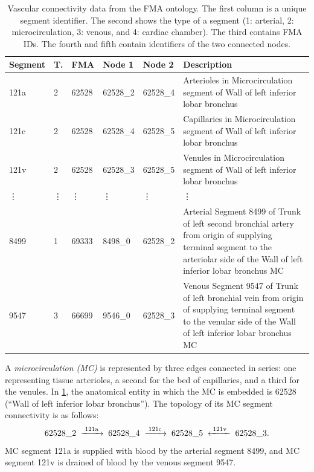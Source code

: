 \begin{table}
	\def\vdt{\hskip1pt\vdots}
	\begin{tabular}{l@{\ }l@{\ }l@{\ }l@{\ }l@{\ }|@{\ }p{6.2cm}}
	  \textbf{Segment} & \textbf{T.} & \textbf{FMA} & \textbf{Node 1} & \textbf{Node 2} & \textbf{Description} \\
	  \hline
	  121a & 2    & 62528  & 62528\_2 & 62528\_4  & Arterioles in Microcirculation segment of Wall of left inferior lobar bronchus \\[.5mm]
	  121c & 2    & 62528  & 62528\_4 & 62528\_5  & Capillaries in Microcirculation segment of Wall of left inferior lobar bronchus\\[.5mm]
	  121v & 2    & 62528  & 62528\_3 & 62528\_5  & Venules in Microcirculation segment of Wall of left inferior lobar bronchus\\
	  \vdt & \vdt & \vdt   & \vdt     & \vdt      & \vdt  \\[.5mm]
	  8499 & 1    & 69333  & 8498\_0  & 62528\_2  & Arterial Segment 8499 of Trunk
	of left second bronchial artery from origin of supplying terminal segment
	to the arteriolar side of the Wall of left inferior lobar bronchus MC\\[.5mm]
	  9547 & 3 & 66699 & 9546\_0 & 62528\_3 & Venous Segment 9547 of Trunk of
	left bronchial vein from origin of supplying terminal segment to the
	venular side of the Wall of left inferior lobar bronchus MC
	\end{tabular}\vskip2mm
	\caption{Vascular connectivity data from the FMA ontology. The first column
	         is a unique segment identifier. The second shows the
	         type of a segment (1: arterial, 2: microcirculation, 3: venous,
	         and 4: cardiac chamber). The third contains FMA IDs. The fourth and
	         fifth contain identifiers of the two connected nodes.}
	\label{tab:vascular-connectivity}
\end{table}

A \emph{microcirculation (MC)} is represented by three edges connected in series: one representing tissue arterioles, a second for the bed of capillaries, and a third for the venules. In \cref{tab:vascular-connectivity}, the anatomical entity in which the MC is embedded is 62528 (``Wall of left inferior lobar bronchus''). The topology of its MC segment connectivity is as follows:
\[
	62528\_2  \;\xrightarrow{\;\text{121a}\;}\;
	62528\_4  \;\xrightarrow{\;\text{121c}\;}\;
	62528\_5  \;\xleftarrow {\;\text{121v}\;}\;
	62528\_3  \text.
\]
MC segment 121a is supplied with blood by the arterial segment 8499, and MC segment 121v is drained of blood by the venous segment 9547.

